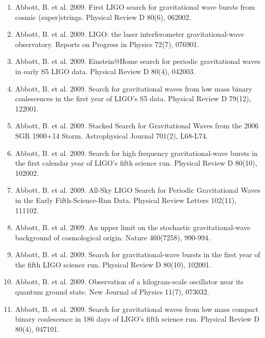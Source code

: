 \documentclass[margin,line]{res}
\begin{document}
\begin{resume}
\begin{enumerate}
\item Abbott, B. et al. 2009. First LIGO search for gravitational wave bursts from cosmic (super)strings. Physical Review D 80(6), 062002. 

\item Abbott, B. et al. 2009. LIGO: the laser interferometer gravitational-wave observatory. Reports on Progress in Physics 72(7), 076901. 

\item Abbott, B. et al. 2009. Einstein@Home search for periodic gravitational waves in early S5 LIGO data. Physical Review D 80(4), 042003. 

\item Abbott, B. et al. 2009. Search for gravitational waves from low mass binary coalescences in the first year of LIGO's S5 data. Physical Review D 79(12), 122001. 

\item Abbott, B. et al. 2009. Stacked Search for Gravitational Waves from the 2006 SGR 1900+14 Storm. Astrophysical Journal 701(2), L68-L74. 

\item Abbott, B. et al. 2009. Search for high frequency gravitational-wave bursts in the first calendar year of LIGO's fifth science run. Physical Review D 80(10),  102002. 

\item Abbott, B. et al. 2009. All-Sky LIGO Search for Periodic Gravitational Waves in the Early Fifth-Science-Run Data. Physical Review Letters 102(11), 111102. 

\item Abbott, B. et al. 2009. An upper limit on the stochastic gravitational-wave background of cosmological origin. Nature 460(7258), 990-994. 

\item Abbott, B. et al. 2009. Search for gravitational-wave bursts in the first year of the fifth LIGO science run. Physical Review D 80(10), 102001. 

\item Abbott, B. et al. 2009. Observation of a kilogram-scale oscillator near its quantum ground state. New Journal of Physics 11(7), 073032.

\item Abbott, B. et al. 2009. Search for gravitational waves from low mass compact binary coalescence in 186 days of LIGO's fifth science run. Physical Review D 80(4), 047101. 

\end{enumerate}


\end{resume}
\end{document}
